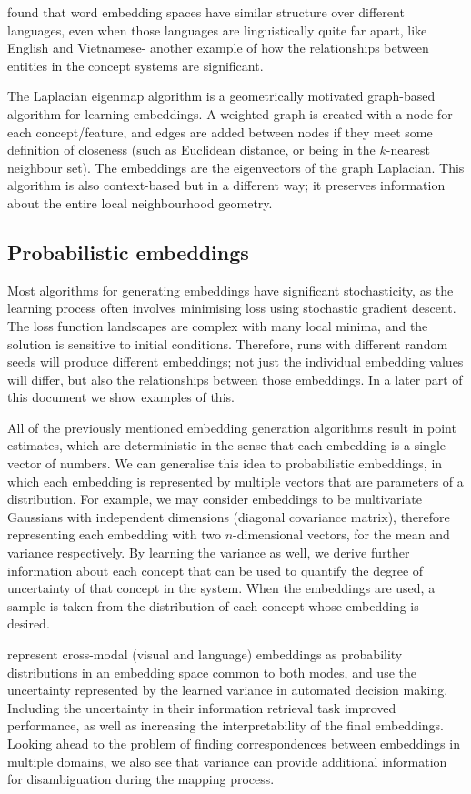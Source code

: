 \cite{MikolovMachineTranslation} found that word embedding spaces have similar structure over different languages, even when those languages are linguistically quite far apart, like English and Vietnamese- another example of how the relationships between entities in the concept systems are significant. 

The Laplacian eigenmap algorithm \cite{LaplacianEigenmaps} is a geometrically motivated graph-based algorithm for learning embeddings. A weighted graph is created with a node for each concept/feature, and edges are added between nodes if they meet some definition of closeness (such as Euclidean distance, or being in the $k$-nearest neighbour set). The embeddings are the eigenvectors of the graph Laplacian. This algorithm is also context-based but in a different way; it preserves information about the entire local neighbourhood geometry. 

\subsection{Probabilistic embeddings}
Most algorithms for generating embeddings have significant stochasticity, as the learning process often involves minimising loss using stochastic gradient descent. The loss function landscapes are complex with many local minima, and the solution is sensitive to initial conditions. Therefore, runs with different random seeds will produce different embeddings; not just the individual embedding values will differ, but also the relationships between those embeddings. In a later part of this document we show examples of this. 

All of the previously mentioned embedding generation algorithms result in point estimates, which are deterministic in the sense that each embedding is a single vector of numbers. We can generalise this idea to probabilistic embeddings, in which each embedding is represented by multiple vectors that are parameters of a distribution. For example, we may consider embeddings to be multivariate Gaussians with independent dimensions (diagonal covariance matrix), therefore representing each embedding with two $n$-dimensional vectors, for the mean and variance respectively. By learning the variance as well, we derive further information about each concept that can be used to quantify the degree of uncertainty of that concept in the system. When the embeddings are used, a sample is taken from the distribution of each concept whose embedding is desired. 

\cite{ProbabilisticEmbeddingsCrossModal} represent cross-modal (visual and language) embeddings as probability distributions in an embedding space common to both modes, and use the uncertainty represented by the learned variance in automated decision making. Including the uncertainty in their information retrieval task improved performance, as well as increasing the interpretability of the final embeddings. Looking ahead to the problem of finding correspondences between embeddings in multiple domains, we also see that variance can provide additional information for disambiguation during the mapping process. 


